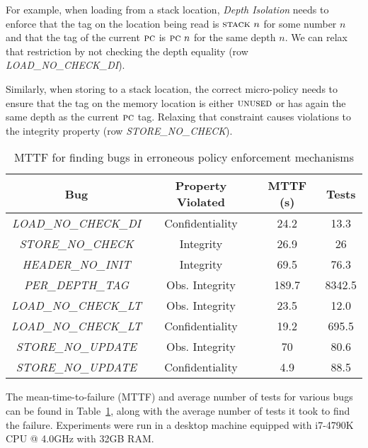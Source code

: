 \documentclass[10pt,conference]{ieeetran}%
\theoremstyle{definition}
\begin{document}
{For example, when loading from a stack location, {\em Depth Isolation}
needs to enforce that the tag on the location being read
is $\textsc{stack} ~ n$ for some number $n$ and that the tag of the
current $\textsc{pc}$ is $\textsc{pc} ~ n$ for the same depth $n$. We can relax
that restriction by not checking the depth equality (row {\em
  LOAD\_NO\_CHECK\_DI}).

Similarly, when storing to a stack location, the correct micro-policy
needs to ensure that the tag on the memory location is either
$\textsc{unused}$ or has again the same depth as the current $\textsc{pc}$
tag. Relaxing that constraint causes violations to the integrity
property (row {\em STORE\_NO\_CHECK}).

\begin{table}[]
\centering
\begin{tabular}{c|c|c|c}
  Bug & Property Violated & MTTF (s) & Tests \\
  \hline
      {\em LOAD\_NO\_CHECK\_DI}  & Confidentiality & 24.2 & 13.3 \\
      {\em STORE\_NO\_CHECK} & Integrity & 26.9 & 26 \\
      {\em HEADER\_NO\_INIT} & Integrity & 69.5 & 76.3 \\
  \hline
  \hline
      {\em PER\_DEPTH\_TAG} & Obs. Integrity & 189.7 & 8342.5  \\
      {\em LOAD\_NO\_CHECK\_LT}  & Obs. Integrity & 23.5 & 12.0 \\
      {\em LOAD\_NO\_CHECK\_LT}  & Confidentiality & 19.2 & 695.5 \\
      {\em STORE\_NO\_UPDATE} & Obs. Integrity & 70 & 80.6  \\
      {\em STORE\_NO\_UPDATE} & Confidentiality & 4.9 & 88.5 \\
  \hline
\end{tabular}
\vspace*{1em}
\caption{MTTF for finding bugs in erroneous policy enforcement mechanisms}
\vspace*{-2em}
\label{tab:bug-table}
\end{table}

The mean-time-to-failure (MTTF) and average number of tests for various bugs can be found in
Table~\ref{tab:bug-table}, along with the average number of tests
it took to find the failure. Experiments were run in a desktop
machine equipped with i7-4790K CPU @ 4.0GHz with 32GB RAM.

}
\end{document}

